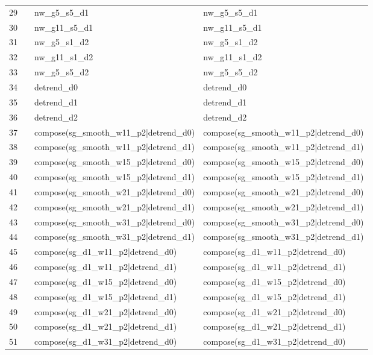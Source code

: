 \begin{tabular}{rlll}
29 &  & nw\_g5\_s5\_d1 & nw\_g5\_s5\_d1 \\
30 &  & nw\_g11\_s5\_d1 & nw\_g11\_s5\_d1 \\
31 &  & nw\_g5\_s1\_d2 & nw\_g5\_s1\_d2 \\
32 &  & nw\_g11\_s1\_d2 & nw\_g11\_s1\_d2 \\
33 &  & nw\_g5\_s5\_d2 & nw\_g5\_s5\_d2 \\
34 &  & detrend\_d0 & detrend\_d0 \\
35 &  & detrend\_d1 & detrend\_d1 \\
36 &  & detrend\_d2 & detrend\_d2 \\
37 &  & compose(sg\_smooth\_w11\_p2|detrend\_d0) & compose(sg\_smooth\_w11\_p2|detrend\_d0) \\
38 &  & compose(sg\_smooth\_w11\_p2|detrend\_d1) & compose(sg\_smooth\_w11\_p2|detrend\_d1) \\
39 &  & compose(sg\_smooth\_w15\_p2|detrend\_d0) & compose(sg\_smooth\_w15\_p2|detrend\_d0) \\
40 &  & compose(sg\_smooth\_w15\_p2|detrend\_d1) & compose(sg\_smooth\_w15\_p2|detrend\_d1) \\
41 &  & compose(sg\_smooth\_w21\_p2|detrend\_d0) & compose(sg\_smooth\_w21\_p2|detrend\_d0) \\
42 &  & compose(sg\_smooth\_w21\_p2|detrend\_d1) & compose(sg\_smooth\_w21\_p2|detrend\_d1) \\
43 &  & compose(sg\_smooth\_w31\_p2|detrend\_d0) & compose(sg\_smooth\_w31\_p2|detrend\_d0) \\
44 &  & compose(sg\_smooth\_w31\_p2|detrend\_d1) & compose(sg\_smooth\_w31\_p2|detrend\_d1) \\
45 &  & compose(sg\_d1\_w11\_p2|detrend\_d0) & compose(sg\_d1\_w11\_p2|detrend\_d0) \\
46 &  & compose(sg\_d1\_w11\_p2|detrend\_d1) & compose(sg\_d1\_w11\_p2|detrend\_d1) \\
47 &  & compose(sg\_d1\_w15\_p2|detrend\_d0) & compose(sg\_d1\_w15\_p2|detrend\_d0) \\
48 &  & compose(sg\_d1\_w15\_p2|detrend\_d1) & compose(sg\_d1\_w15\_p2|detrend\_d1) \\
49 &  & compose(sg\_d1\_w21\_p2|detrend\_d0) & compose(sg\_d1\_w21\_p2|detrend\_d0) \\
50 &  & compose(sg\_d1\_w21\_p2|detrend\_d1) & compose(sg\_d1\_w21\_p2|detrend\_d1) \\
51 &  & compose(sg\_d1\_w31\_p2|detrend\_d0) & compose(sg\_d1\_w31\_p2|detrend\_d0) \\

\end{tabular}
